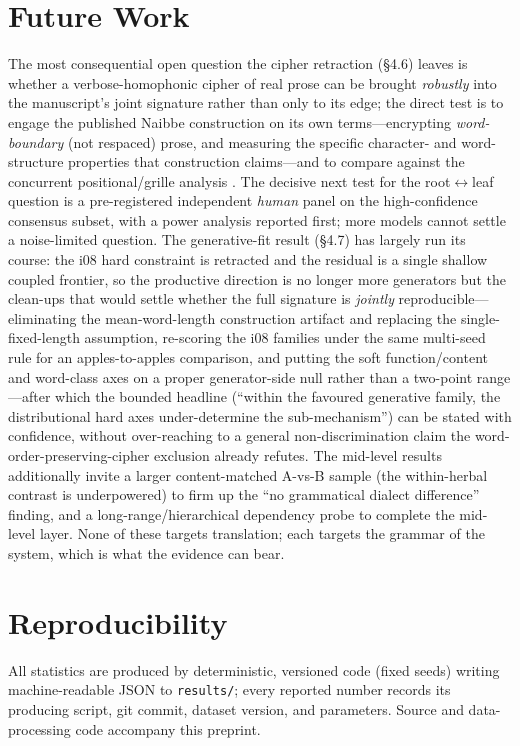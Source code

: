 \documentclass[11pt]{article}
\begin{document}
\section{Future Work}
The most consequential open question the cipher retraction (\S4.6) leaves is whether a
verbose-homophonic cipher of real prose can be brought \emph{robustly} into the manuscript's
joint signature rather than only to its edge; the direct test is to engage the published
Naibbe construction \citep{greshko2025naibbe} on its own terms---encrypting
\emph{word-boundary} (not respaced) prose, and measuring the specific character- and
word-structure properties that construction claims---and to compare against the concurrent
positional/grille analysis \citep{parisel2026layered}. The decisive next test for the
root$\leftrightarrow$leaf question is a pre-registered
independent \emph{human} panel on the high-confidence consensus subset, with a power
analysis reported first; more models cannot settle a noise-limited question. The
generative-fit result (\S4.7) has largely run its course: the i08 hard constraint is
retracted and the residual is a single shallow coupled frontier, so the productive direction
is no longer more generators but the clean-ups that would settle whether the full signature
is \emph{jointly} reproducible---eliminating the mean-word-length construction artifact and
replacing the single-fixed-length assumption, re-scoring the i08 families under the same
multi-seed rule for an apples-to-apples comparison, and putting the soft function/content and
word-class axes on a proper generator-side null rather than a two-point range---after which
the bounded headline (``within the favoured generative family, the distributional hard axes
under-determine the sub-mechanism'') can be stated with confidence, without over-reaching to
a general non-discrimination claim the word-order-preserving-cipher exclusion already refutes. The mid-level
results additionally
invite a larger content-matched A-vs-B sample (the within-herbal contrast is
underpowered) to firm up the ``no grammatical dialect difference'' finding, and a
long-range/hierarchical dependency probe to complete the mid-level layer. None of these
targets translation; each targets the grammar of the system, which is what the evidence
can bear.

\section*{Reproducibility}
All statistics are produced by deterministic, versioned code (fixed seeds) writing
machine-readable JSON to \texttt{results/}; every reported number records its
producing script, git commit, dataset version, and parameters. Source and
data-processing code accompany this preprint.



\end{document}
